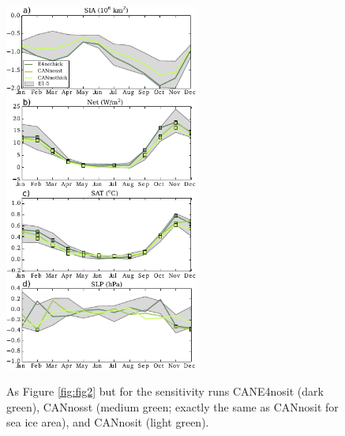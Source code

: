 \documentclass[twocol]{ametsoc}
\begin{document}
\begin{figure}[t]
  \noindent\includegraphics[width=15pc,angle=0]{seacyclessens.pdf}\\
  \caption{As Figure \ref{fig:fig2} but for the sensitivity runs CANE4nosit (dark green), CANnosst (medium green; exactly the same as CANnosit for sea ice area), and CANnosit (light green). 
}\label{fig:fig2b}
\end{figure} %
\end{document}
